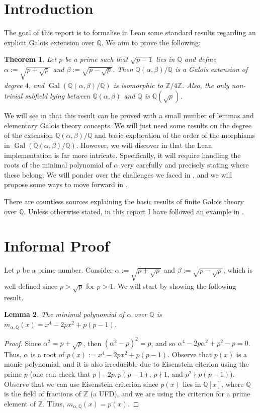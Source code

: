 \documentclass[a4paper,11pt]{article}
\theoremstyle{plain}
\newtheorem{theorem}{Theorem}
\newtheorem{lemma}[theorem]{Lemma}
\newcommand{\Q}{\ensuremath{\mathbb{Q}}} %
\newcommand{\Z}{\ensuremath{\mathbb{Z}}} %
\DeclareMathOperator{\Gal}{Gal} %
\begin{document}
	\vspace{0.5cm}
	
	\section{Introduction}
	
	The goal of this report is to formalise in Lean some standard results regarding an explicit Galois extension over $\Q$. We aim to prove the following:
	\begin{theorem}
		Let $p$ be a prime such that $\sqrt{p-1}$ lies in $\Q$ and define $\alpha:=\sqrt{p+\sqrt{p}}$ and $\beta:=\sqrt{p-\sqrt{p}}$. Then $\Q(\alpha,\beta)/\Q$ is a Galois extension of degree $4$, and $\Gal(\Q(\alpha,\beta)/\Q)$ is isomorphic to $\Z/4\Z$. Also, the only non-trivial subfield lying between $\Q(\alpha,\beta)$ and $\Q$ is $\Q(\sqrt{p})$.
	\end{theorem}
	
	We will see in  that this result can be proved with a small number of lemmas and elementary Galois theory concepts. We will just need some results on the degree of the extension $\Q(\alpha,\beta)/\Q$ and basic exploration of the order of the morphisms in $\Gal(\Q(\alpha,\beta)/\Q)$. However, we will discover in  that the Lean implementation is far more intricate. Specifically, it will require handling the roots of the minimal polynomial of $\alpha$ very carefully and precisely stating where these belong. We will ponder over the challenges we faced in , and we will propose some ways to move forward in .
	
	There are countless sources explaining the basic results of finite Galois theory over $\Q$. Unless otherwise stated, in this report I have followed an example in \cite{xarles}.

	\section{Informal Proof}\label{sec:informal}
	
	Let $p$ be a prime number. Consider $\alpha:=\sqrt{p+\sqrt{p}}$ and $\beta:=\sqrt{p-\sqrt{p}}$, which is well-defined since $p>\sqrt{p}$ for $p>1$. We will start by showing the following result.
	
	\begin{lemma}\label{lemma:IrrPol}
		The minimal polynomial of $\alpha$ over $\Q$ is $m_{\alpha,\Q}(x)=x^4-2px^2+p(p-1)$.
	\end{lemma}
	\begin{proof}
		Since $\alpha^2=p+\sqrt{p}$, then $(\alpha^2-p)^2=p$, and so $\alpha^4-2p\alpha^2+p^2-p=0$. Thus, $\alpha$ is a root of $p(x):=x^4-2px^2+p(p-1)$. Observe that $p(x)$ is a monic polynomial, and it is also irreducible due to Eisenstein citerion using the prime $p$ (one can check that $p\mid -2p, p(p-1)$, $p\nmid 1$, and $p^2\nmid p(p-1)$). Observe that we can use Eisenstein criterion since $p(x)$ lies in $\Q[x]$, where $\Q$ is the field of fractions of $\Z$ (a UFD), and we are using the criterion for a prime element of $\Z$. Thus, $m_{\alpha,\Q}(x)=p(x)$.
	\end{proof}
	
\end{document}
